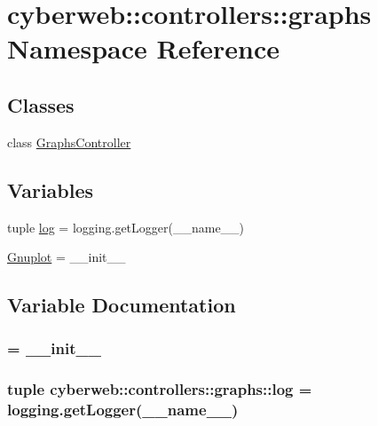 \hypertarget{namespacecyberweb_1_1controllers_1_1graphs}{\section{cyberweb\-:\-:controllers\-:\-:graphs \-Namespace \-Reference}
\label{namespacecyberweb_1_1controllers_1_1graphs}
}
\subsection*{\-Classes}
\begin{DoxyCompactItemize}
\item 
class \hyperlink{classcyberweb_1_1controllers_1_1graphs_1_1_graphs_controller}{\-Graphs\-Controller}
\end{DoxyCompactItemize}
\subsection*{\-Variables}
\begin{DoxyCompactItemize}
\item 
tuple \hyperlink{namespacecyberweb_1_1controllers_1_1graphs_ae51d7d6673e1b8d7e4cb8dc869013e84}{log} = logging.\-get\-Logger(\-\_\-\-\_\-name\-\_\-\-\_\-)
\item 
\hyperlink{namespacecyberweb_1_1controllers_1_1graphs_af25f74c3f1bd773378051cc5b6009c12}{\-Gnuplot} = \-\_\-\-\_\-init\-\_\-\-\_\-
\end{DoxyCompactItemize}


\subsection{\-Variable \-Documentation}
\hypertarget{namespacecyberweb_1_1controllers_1_1graphs_af25f74c3f1bd773378051cc5b6009c12}{
\subsubsection[{\-Gnuplot}]{ = \-\_\-\-\_\-init\-\_\-\-\_\-}}\label{namespacecyberweb_1_1controllers_1_1graphs_af25f74c3f1bd773378051cc5b6009c12}
\hypertarget{namespacecyberweb_1_1controllers_1_1graphs_ae51d7d6673e1b8d7e4cb8dc869013e84}{
\subsubsection[{log}]{\setlength{\rightskip}{0pt plus 5cm}tuple {\bf cyberweb\-::controllers\-::graphs\-::log} = logging.\-get\-Logger(\-\_\-\-\_\-name\-\_\-\-\_\-)}}\label{namespacecyberweb_1_1controllers_1_1graphs_ae51d7d6673e1b8d7e4cb8dc869013e84}
